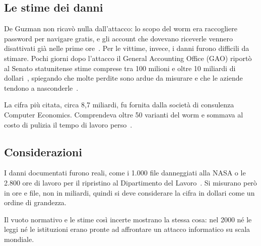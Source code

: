 \subsection{Le stime dei danni}\label{subsec:stimeDanni}
De Guzman non ricavò nulla dall'attacco: lo scopo del worm era raccogliere password per navigare gratis, e gli account che dovevano riceverle vennero disattivati già nelle prime ore~\cite[p.~2]{gao2000iloveyou}.
Per le vittime, invece, i danni furono difficili da stimare.
Pochi giorni dopo l'attacco il General Accounting Office (GAO) riportò al Senato statunitense stime comprese tra 100 milioni e oltre 10 miliardi di dollari~\cite[pp.~4--5]{gao2000iloveyou}, spiegando che molte perdite sono ardue da misurare e che le aziende tendono a nasconderle~\cite[p.~5]{gao2000iloveyou}.

La cifra più citata, circa 8,7 miliardi, fu fornita dalla società di consulenza Computer Economics.
Comprendeva oltre 50 varianti del worm e sommava al costo di pulizia il tempo di lavoro perso~\cite{outlaw2001}.

\subsection{Considerazioni}
I danni documentati furono reali, come i 1.000 file danneggiati alla NASA o le 2.800 ore di lavoro per il ripristino al Dipartimento del Lavoro~\cite[pp.~7--8]{gao2000iloveyou}.
Si misurano però in ore e file, non in miliardi, quindi si deve considerare la cifra in dollari come un ordine di grandezza.

Il vuoto normativo e le stime così incerte mostrano la stessa cosa: nel 2000 né le leggi né le istituzioni erano pronte ad affrontare un attacco informatico su scala mondiale.
